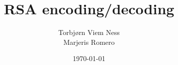 \newcommand{\mytitle}{RSA encoding/decoding}
\newcommand{\mygroupnumber}{3}
\newcommand{\myauthor}{Torbjørn Viem Ness\\Marjeris Romero}

\title{\mytitle}
\author{\myauthor}
\date{\today}
